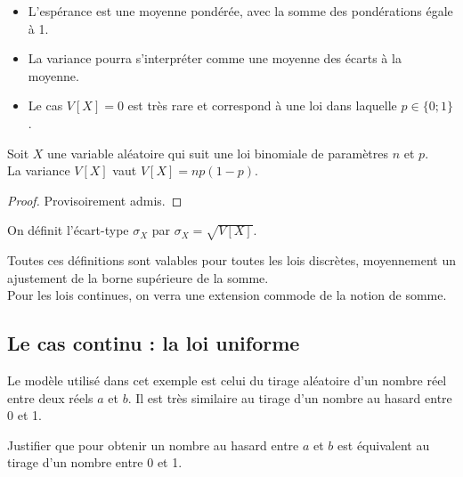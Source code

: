 \documentclass[12pt,a4paper,french]{article}
\begin{document}
\begin{remarque}
  \begin{itemize}
    \item L'espérance est une moyenne pondérée, avec la somme des
      pondérations égale à 1.
    \item La variance pourra s'interpréter comme une moyenne des écarts à la
      moyenne.
    \item Le cas $V[X] = 0$ est très rare et correspond à une loi dans
      laquelle $p \in \{0;1\}$.
  \end{itemize}
\end{remarque}

\begin{proposition}
  Soit $X$ une variable aléatoire qui suit une loi binomiale de paramètres
  $n$ et $p$.\\
  La variance $V[X]$ vaut $V[X] = np(1-p)$.
\end{proposition}
\begin{proof}
  Provisoirement admis.
\end{proof}

\begin{definition}
  On définit l'écart-type $\sigma_X$ par $\sigma_X = \sqrt{V[X]}$.
\end{definition}

\begin{remarque}
  Toutes ces définitions sont valables pour toutes les lois discrètes,
  moyennement un ajustement de la borne supérieure de la somme.\\
  Pour les lois continues, on verra une extension commode de la notion de
  somme.
\end{remarque}

\subsection{Le cas continu : la loi uniforme}

Le modèle utilisé dans cet exemple est celui du tirage aléatoire d'un
nombre réel entre deux réels $a$ et $b$. Il est très similaire au tirage
d'un nombre au hasard entre 0 et 1.

\begin{question}
  Justifier que pour obtenir un nombre au hasard entre $a$ et $b$ est
  équivalent au tirage d'un nombre entre 0 et 1.
\end{question}

\end{document}
